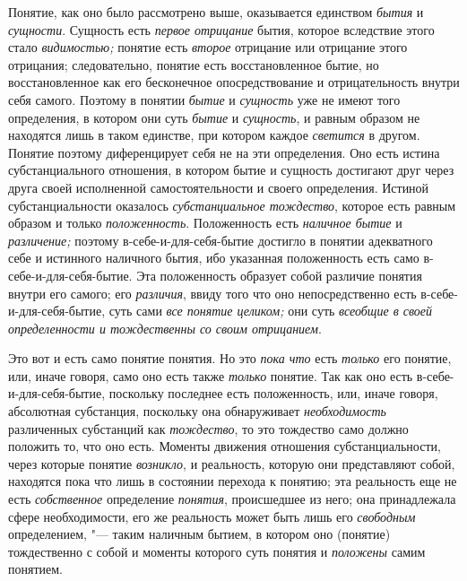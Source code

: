 Понятие, как оно было рассмотрено выше, оказывается единством {\em бытия} и
{\em сущности}. Сущность есть {\em первое отрицание} бытия, которое вследствие
этого стало {\em видимостью;} понятие есть {\em второе}
отрицание или отрицание этого отрицания; следовательно,
понятие есть восстановленное бытие, но восстановленное как его бесконечное
опосредствование и отрицательность внутри себя самого. Поэтому в понятии
{\em бытие} и {\em сущность} уже не имеют того определения, в котором они суть
{\em бытие} и {\em сущность}, и равным образом не находятся лишь в таком
единстве, при котором каждое {\em светится} в другом.
Понятие поэтому диференцирует себя не на эти определения. Оно есть истина
субстанциального отношения, в котором бытие и сущность достигают друг через
друга своей исполненной самостоятельности и своего определения. Истиной
субстанциальности оказалось {\em субстанциальное тождество},
которое есть равным образом и только {\em положенность}.
Положенность есть {\em наличное бытие} и {\em различение;} поэтому
в-себе-и-для-себя-бытие достигло в понятии адекватного себе и истинного
наличного бытия, ибо указанная положенность есть само
в-себе-и-для-себя-бытие. Эта положенность образует собой различие понятия
внутри его самого; его {\em различия}, ввиду того что
оно
непосредственно есть в-себе-и-для-себя-бытие, суть сами
{\em все понятие целиком;} они суть {\em всеобщие в
своей определенности и тождественны со своим отрицанием}.

Это вот и есть само понятие понятия. Но это {\em пока что} есть
{\em только} его понятие, или, иначе говоря, само оно есть также
{\em только} понятие. Так
как оно есть в-себе-и-для-себя-бытие, поскольку последнее есть
положенность, или, иначе говоря, абсолютная субстанция, поскольку она
обнаруживает {\em необходимость} различенных субстанций как
{\em тождество}, то это
тождество само должно положить то, что оно есть. Моменты движения отношения
субстанциальности, через которые понятие {\em возникло}, и
реальность, которую они представляют собой, находятся пока что лишь в
состоянии перехода к понятию; эта реальность еще не есть
{\em собственное} определение {\em понятия},
происшедшее из него; она принадлежала сфере необходимости,
его же реальность может быть лишь его {\em свободным}
определением, "--- таким наличным бытием, в
котором оно (понятие) тождественно с собой и моменты которого суть понятия
и {\em положены} самим понятием.

